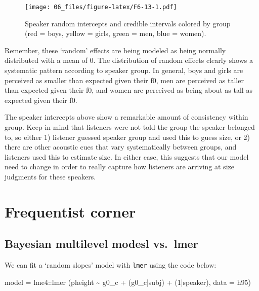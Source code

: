 \documentclass[
]{book}
\newenvironment{Shaded}{\begin{snugshade}}{\end{snugshade}}
\newcommand{\AttributeTok}[1]{\textcolor[rgb]{0.77,0.63,0.00}{#1}}
\newcommand{\DecValTok}[1]{\textcolor[rgb]{0.00,0.00,0.81}{#1}}
\newcommand{\FunctionTok}[1]{\textcolor[rgb]{0.00,0.00,0.00}{#1}}
\newcommand{\NormalTok}[1]{#1}
\newcommand{\OtherTok}[1]{\textcolor[rgb]{0.56,0.35,0.01}{#1}}
\newcommand{\SpecialCharTok}[1]{\textcolor[rgb]{0.00,0.00,0.00}{#1}}
\begin{document}
\begin{figure}
\centering
\texttt{[image: 06\_files/figure-latex/F6-13-1.pdf]}
\caption{\label{fig:F6-13}Speaker random intercepts and credible intervals colored by group (red = boys, yellow = girls, green = men, blue = women).}
\end{figure}

Remember, these `random' effects are being modeled as being normally distributed with a mean of 0. The distribution of random effects clearly shows a systematic pattern according to speaker group. In general, boys and girls are perceived as smaller than expected given their f0, men are perceived as taller than expected given their f0, and women are perceived as being about as tall as expected given their f0.

The speaker intercepts above show a remarkable amount of consistency within group. Keep in mind that listeners were not told the group the speaker belonged to, so either 1) listener guessed speaker group and used this to guess size, or 2) there are other acoustic cues that vary systematically between groups, and listeners used this to estimate size. In either case, this suggests that our model need to change in order to really capture how listeners are arriving at size judgments for these speakers.

\hypertarget{frequentist-corner-3}{%
\section{Frequentist corner}\label{frequentist-corner-3}}

\hypertarget{bayesian-multilevel-modesl-vs.-lmer-3}{%
\subsection{Bayesian multilevel modesl vs.~lmer}\label{bayesian-multilevel-modesl-vs.-lmer-3}}

We can fit a `random slopes' model with \texttt{lmer} using the code below:

\begin{Shaded}
\begin{Highlighting}[]
\NormalTok{model }\OtherTok{=}\NormalTok{ lme4}\SpecialCharTok{::}\FunctionTok{lmer}\NormalTok{ (pheight }\SpecialCharTok{\textasciitilde{}}\NormalTok{ g0\_c }\SpecialCharTok{+}\NormalTok{  (g0\_c}\SpecialCharTok{|}\NormalTok{subj) }\SpecialCharTok{+}\NormalTok{ (}\DecValTok{1}\SpecialCharTok{|}\NormalTok{speaker), }\AttributeTok{data =}\NormalTok{ h95)}
\end{Highlighting}
\end{Shaded}
\end{document}
